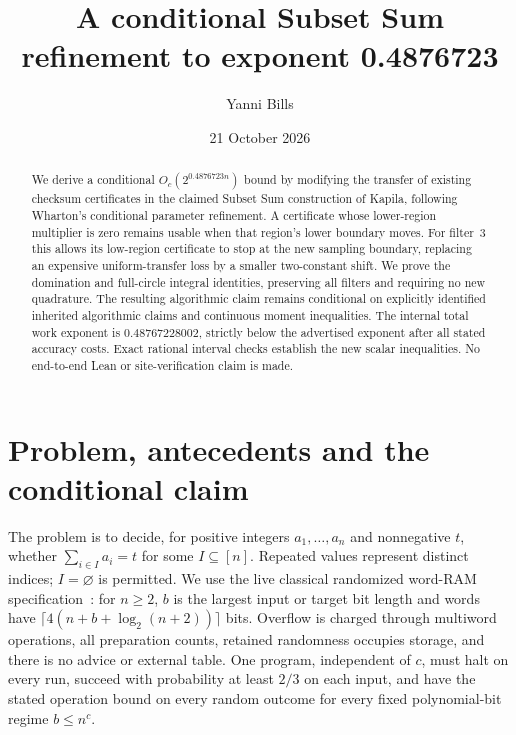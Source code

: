 \documentclass[11pt]{article}
\title{A conditional Subset Sum refinement to exponent 0.4876723}
\author{Yanni Bills}
\date{21 October 2026}
\theoremstyle{remark}\newtheorem*{remark}{Scope}
\begin{document}
\maketitle
\begin{abstract}
We derive a conditional $O_c(2^{0.4876723n})$ bound by modifying the transfer of existing checksum certificates in the claimed
Subset Sum construction of Kapila, following Wharton's conditional parameter
refinement. A certificate whose lower-region multiplier is zero remains
usable when that region's lower boundary moves. For filter~3 this allows
its low-region certificate to stop at the new sampling boundary, replacing
an expensive uniform-transfer loss by a smaller two-constant shift.
We prove the domination and full-circle integral identities, preserving all
filters and requiring no new quadrature. The resulting algorithmic claim
remains conditional on explicitly identified inherited algorithmic claims
and continuous moment inequalities. The internal total work exponent is $0.48767228002$, strictly below the advertised exponent after all stated accuracy costs. Exact rational interval checks establish the new scalar inequalities. No end-to-end Lean or site-verification claim is made.
\end{abstract}

\section{Problem, antecedents and the conditional claim}
The problem is to decide, for positive integers $a_1,\ldots,a_n$ and
nonnegative $t$, whether $\sum_{i\in I}a_i=t$ for some $I\subseteq[n]$.
Repeated values represent distinct indices; $I=\varnothing$ is permitted.
We use the live classical randomized word-RAM specification~\cite{benchmark}:
for $n\ge2$, $b$ is the largest input or target bit length and words have
$\lceil4(n+b+\log_2(n+2))\rceil$ bits. Overflow is charged through multiword
operations, all preparation counts, retained randomness occupies storage,
and there is no advice or external table. One program, independent of $c$,
must halt on every run, succeed with probability at least $2/3$ on each
input, and have the stated operation bound on every random outcome for
every fixed polynomial-bit regime $b\le n^c$.
\end{document}
